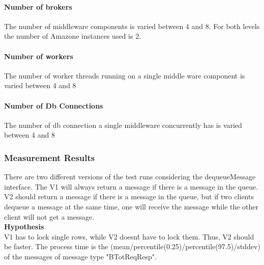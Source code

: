\documentclass[milestone1.tex]{subfiles}
\begin{document}
\paragraph{Number of brokers}

The number of middleware components is varied between 4 and 8. For both levels the number of Amazone instances used is 2.

\paragraph{Number of workers}

The number of worker threads running on a single middle ware component is varied between 4 and 8

\paragraph{Number of Db Connections}

The number of db connection a single middleware concurrently has is varied between 4 and 8

\subsubsection{Measurement Results}

There are two different versions of the test runs considering the dequeueMessage interface. The V1 will always return a message if there is a message in the queue. V2 should return a message if there is a message in the queue, but if two clients dequeue a message at the same time, one will receive the message while the other client will not get a message.\\

\textbf{Hypothesis}\\

V1 has to lock single rows, while V2 doesn\'t have to lock them. Thus, V2 should be faster. The process time is the (mean/percentile(0.25)/percentile(97.5)/stddev) of the messages of message type "BTotReqResp".\\
\end{document}
